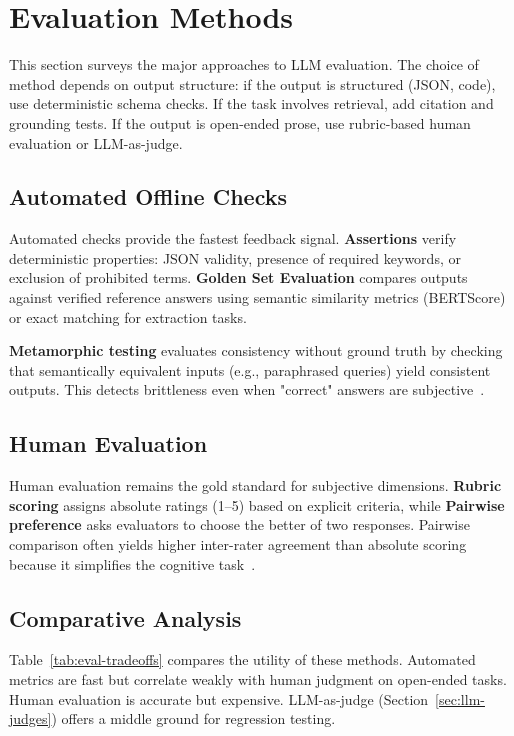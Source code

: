 
\section{Evaluation Methods}
\label{sec:eval-methods}

This section surveys the major approaches to LLM evaluation. The choice of method depends on output structure: if the output is structured (JSON, code), use deterministic schema checks. If the task involves retrieval, add citation and grounding tests. If the output is open-ended prose, use rubric-based human evaluation or LLM-as-judge.

\subsection{Automated Offline Checks}

Automated checks provide the fastest feedback signal. \textbf{Assertions} verify deterministic properties: JSON validity, presence of required keywords, or exclusion of prohibited terms. \textbf{Golden Set Evaluation} compares outputs against verified reference answers using semantic similarity metrics (BERTScore) or exact matching for extraction tasks.

\textbf{Metamorphic testing} evaluates consistency without ground truth by checking that semantically equivalent inputs (e.g., paraphrased queries) yield consistent outputs. This detects brittleness even when "correct" answers are subjective~\citep{zhu2023promptbench}.

\subsection{Human Evaluation}

Human evaluation remains the gold standard for subjective dimensions. \textbf{Rubric scoring} assigns absolute ratings (1--5) based on explicit criteria, while \textbf{Pairwise preference} asks evaluators to choose the better of two responses. Pairwise comparison often yields higher inter-rater agreement than absolute scoring because it simplifies the cognitive task~\citep{zheng2023judging}.

\subsection{Comparative Analysis}
\label{sec:eval-tradeoffs}

Table~\ref{tab:eval-tradeoffs} compares the utility of these methods. Automated metrics are fast but correlate weakly with human judgment on open-ended tasks. Human evaluation is accurate but expensive. LLM-as-judge (Section~\ref{sec:llm-judges}) offers a middle ground for regression testing.

